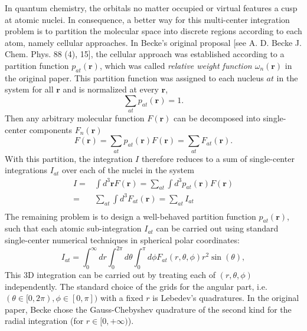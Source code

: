 \documentclass[a4paper,12pt]{article}
\begin{document}
In quantum chemistry, the orbitals no matter occupied or virtual features a cusp at atomic nuclei. In consequence,
a better way for this multi-center integration problem is to partition the molecular space into discrete regions
according to each atom, namely cellular approaches. In Becke's original proposal [see A. D. Becke J. Chem. Phys. 
88 (4), 15], the cellular approach was established according to a partition function $p_{at}(\textbf{r})$,
which was called \textit{relative weight function $\omega_n(\textbf{r})$} in the original paper.
This partition function was assigned to each nucleus $at$ in the system for all $\textbf{r}$ and is normalized at every $\textbf{r}$, 
\begin{equation}
	\sum_{at}p_{at}(\textbf{r}) = 1.
\end{equation}
Then any arbitrary molecular function $F(\textbf{r})$ can be decomposed into single-center components $F_n(\textbf{r})$
\begin{equation}
	F(\textbf{r})=\sum_{at}p_{at}(\textbf{r})F(\textbf{r})=\sum_{at}F_{at}(\textbf{r}).
\end{equation}
With this partition, the integration $I$ therefore reduces to a sum of single-center integrations $I_{at}$ over each of the
nuclei in the system
\begin{equation}
	\begin{split}
		I=&\int d^3\textbf{r}F(\textbf{r})=\sum_{at}\int d^3p_{at}(\textbf{r})F(\textbf{r})\\
		 =&\sum_{at}\int d^3F_{at}(\textbf{r})=\sum_{at}I_{at}\\
	 \end{split}
 \end{equation}
 The remaining problem is to design a well-behaved partition function $p_{at}(\textbf{r})$, such that each atomic sub-integration
 $I_{at}$ can be carried out using standard single-center numerical techniques in spherical polar coordinates:
 \begin{equation}
	 I_{at}=\int_0^\infty dr \int_0^{2\pi} d\theta \int_0^{\pi} d\phi F_{at}(r,\theta,\phi)r^2\sin(\theta),
 \end{equation}
 This 3D integration can be carried out by treating each of $(r,\theta,\phi)$ independently.
 The standard choice of the grids for the angular part, i.e. $(\theta\in[0,2\pi),\phi\in[0,\pi])$  with a fixed $r$ is 
 Lebedev's quadratures. In the original paper, Becke chose the Gauss-Chebyshev quadrature of the second kind for the radial
 integration (for $r\in[0,+\infty)$).
\end{document}
